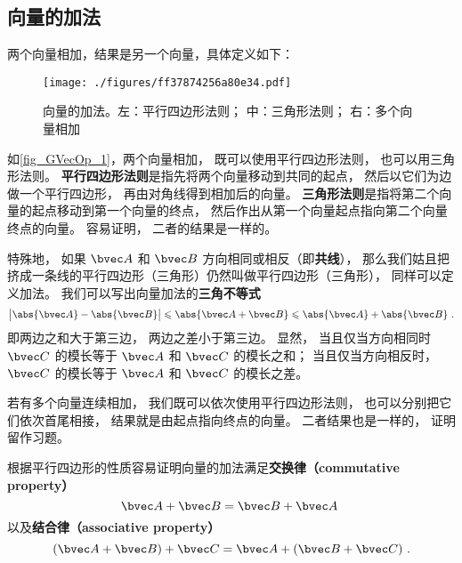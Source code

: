 



\subsection{向量的加法}
两个向量相加，结果是另一个向量，具体定义如下：
\begin{figure}[ht]
\centering
\texttt{[image: ./figures/ff37874256a80e34.pdf]}
\caption{向量的加法。左：平行四边形法则； 中：三角形法则； 右：多个向量相加} \label{fig_GVecOp_1}
\end{figure}
如\autoref{fig_GVecOp_1}，两个向量相加， 既可以使用平行四边形法则， 也可以用三角形法则。 \textbf{平行四边形法则}是指先将两个向量移动到共同的起点， 然后以它们为边做一个平行四边形， 再由对角线得到相加后的向量。 \textbf{三角形法则}是指将第二个向量的起点移动到第一个向量的终点， 然后作出从第一个向量起点指向第二个向量终点的向量。 容易证明， 二者的结果是一样的。

特殊地， 如果 $\bvec A$ 和 $\bvec B$ 方向相同或相反（即\textbf{共线}）， 那么我们姑且把挤成一条线的平行四边形（三角形）仍然叫做平行四边形（三角形）， 同样可以定义加法。 我们可以写出向量加法的\textbf{三角不等式}
\begin{equation}
\big|\abs{\bvec A} - \abs{\bvec B}\big| \leqslant \abs{\bvec A + \bvec B} \leqslant \abs{\bvec A} + \abs{\bvec B}~.
\end{equation}
即两边之和大于第三边， 两边之差小于第三边。 显然， 当且仅当方向相同时 $\bvec C$ 的模长等于 $\bvec A$ 和 $\bvec C$ 的模长之和； 当且仅当方向相反时， $\bvec C$ 的模长等于 $\bvec A$ 和 $\bvec C$ 的模长之差。 

若有多个向量连续相加， 我们既可以依次使用平行四边形法则， 也可以分别把它们依次首尾相接， 结果就是由起点指向终点的向量。 二者结果也是一样的， 证明留作习题。

根据平行四边形的性质容易证明向量的加法满足\textbf{交换律（commutative property）}
\begin{equation}
\bvec A + \bvec B = \bvec B + \bvec A~
\end{equation}
以及\textbf{结合律（associative property）}
\begin{equation}
(\bvec A + \bvec B) + \bvec C = \bvec A + (\bvec B + \bvec C)~.
\end{equation}

